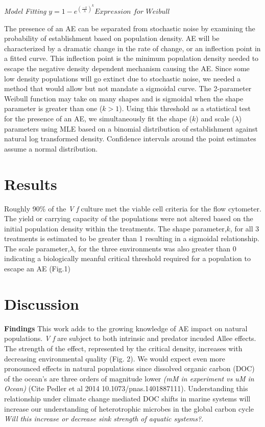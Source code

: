 \documentclass[a4paper,10pt]{article}
\begin{document}
\textit{Model Fitting}
$y = 1-e^{(\frac{-x}{\lambda})^{k}} \textit{Expression for Weibull}$
	
The presence of an AE can be separated from stochastic noise by examining the probability of establishment based on population density. AE will be characterized by a dramatic change in the rate of change, or an inflection point in a fitted curve. This inflection point is the minimum population density needed to escape the negative density dependent mechanism causing the AE. Since some low density populations will go extinct due to stochastic noise, we needed a method that would allow but not mandate a sigmoidal curve. The 2-parameter Weibull function may take on many shapes and is sigmoidal when the shape parameter is greater than one ($k>1$). Using this threshold as a statistical test for the presence of an AE, we simultaneously fit the shape ($k$) and scale ($\lambda$) parameters using MLE based on a binomial distribution of establishment against natural log transformed density. Confidence intervals around the point estimates assume a normal distribution. 
\section{Results}

Roughly 90\% of the \textit{V f} culture met the viable cell criteria for the flow cytometer. The yield or carrying capacity of the populations were not altered based on the initial population density within the treatments. The shape parameter,$k$, for all 3 treatments is estimated to be greater than 1 resulting in a sigmoidal relationship. The scale parameter,$\lambda$, for the three environments was also greater than 0 indicating a biologically meanful critical threshold required for a population to escape an AE (Fig.1) 
   
\section{Discussion}

\textbf{Findings}
This work adds to the growing knowledge of AE impact on natural populations. \textit{V f} are subject to both intrinsic and predator incuded Allee effects. The strength of the effect, represented by the critical density, increases with decreasing environmental quality (Fig. 2). We would expect even more pronounced effects in natural populations since dissolved organic carbon (DOC) of the ocean's are three orders of magnitude lower \textit{(mM in experiment vs uM in Ocean)} (Cite Pedler et al 2014  10.1073/pnas.1401887111).  Understanding this relationship under climate change mediated DOC shifts in marine systems will increase our understanding of heterotrophic microbes in the global carbon cycle \textit{Will this increase or decrease sink strength of aquatic systems?}. 
	
\end{document}
